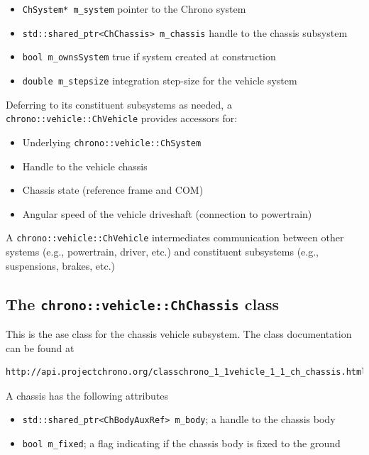 \begin{itemize}
\item \lstinline{ChSystem* m_system} pointer to the Chrono system
\item \lstinline{std::shared_ptr<ChChassis> m_chassis} handle to the chassis subsystem
\item \lstinline{bool m_ownsSystem} true if system created at construction
\item \lstinline{double m_stepsize}  integration step-size for the vehicle system
\end{itemize}

Deferring to its constituent subsystems as needed, a \lstinline{chrono::vehicle::ChVehicle} provides accessors for:

\begin{itemize}
\item Underlying \lstinline{chrono::vehicle::ChSystem}
\item Handle to the vehicle chassis
\item Chassis state (reference frame and COM)
\item Angular speed of the vehicle driveshaft (connection to powertrain)
\end{itemize}

A \lstinline{chrono::vehicle::ChVehicle} intermediates communication between other systems (e.g.,
powertrain, driver, etc.) and constituent subsystems (e.g., suspensions, brakes, etc.)

\subsection{ The \lstinline{chrono::vehicle::ChChassis} class}

This is the ase class for the chassis vehicle subsystem. The class documentation can be found at 

\begin{lstlisting}
http://api.projectchrono.org/classchrono_1_1vehicle_1_1_ch_chassis.html
\end{lstlisting}

A chassis has the following attributes

\begin{itemize}
\item \lstinline{std::shared_ptr<ChBodyAuxRef> m_body}; a handle to the chassis body
\item \lstinline{bool m_fixed}; a flag indicating if the chassis body is fixed to the ground
\end{itemize}

